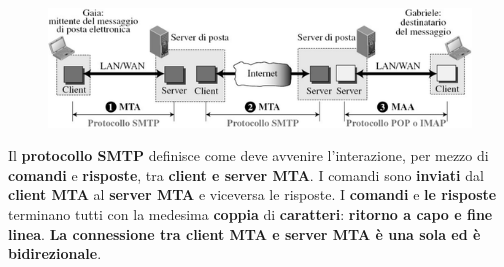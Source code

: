 \documentclass[11pt,a4paper,oneside]{book}
\theoremstyle{definition}
\begin{document}
\begin{figure}[!h]
	\includegraphics[scale=0.7]{Immagini/SMTP.png}
	\centering
\end{figure}
Il \textbf{protocollo SMTP} definisce come deve avvenire l'interazione, per mezzo di \textbf{comandi} e \textbf{risposte}, tra \textbf{client e server MTA}. I comandi sono \textbf{inviati} dal \textbf{client MTA} al \textbf{server MTA} e viceversa le risposte.
I \textbf{comandi} e \textbf{le risposte} terminano tutti con la medesima \textbf{coppia} di \textbf{caratteri}: \textbf{ritorno a capo e fine linea}.\newline
\textbf{La connessione tra client MTA e server MTA è una sola ed è bidirezionale}.\newline
\end{document}
